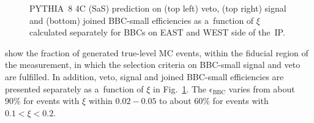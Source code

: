 \begin{figure}[t!]
\begin{subfigure}{.45\textwidth}
	\end{subfigure}
	\begin{minipage}{.45\textwidth}
		\caption{PYTHIA~8 4C (SaS) prediction on  (top left) veto, (top right) signal and (bottom) joined BBC-small efficiencies  as a~function of  $\xi$ calculated separately for BBCs on EAST and WEST side of the~IP.}
		\label{fig:bbcAcceptance}
	\end{minipage}
	
\end{figure}

 show the fraction of generated true-level MC events, within the fiducial region of the measurement, in which the selection criteria on BBC-small signal and veto are fulfilled. In addition, veto, signal and joined BBC-small efficiencies are presented separately as a~function of $\xi$ in Fig.~\ref{fig:bbcAcceptance}. The $\epsilon_\textrm{BBC}$  varies from about $90\%$ for events with $\xi$ within $0.02-0.05$ to about $60\%$ for events with $0.1<\xi<0.2$.

